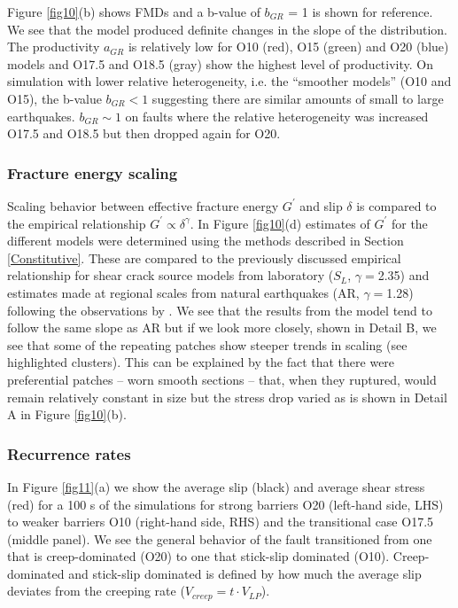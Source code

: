 \documentclass[preprint,1p, 10pt,authoryear]{elsarticle}
\begin{document}
Figure \ref{fig10}(b) shows FMDs and a b-value of $b_{GR}$ = 1 is shown for reference. We see that the model produced definite changes in the slope of the distribution.  The productivity $a_{GR}$  is relatively low for O10 (red), O15 (green) and O20 (blue) models and O17.5 and O18.5 (gray) show the highest level of productivity. On simulation with lower relative heterogeneity, i.e. the ``smoother models'' (O10 and O15), the b-value $b_{GR} < 1$ suggesting there are similar amounts of small to large earthquakes.  $b_{GR} \sim 1$ on faults where the relative heterogeneity was increased O17.5 and O18.5 but then dropped again for O20.

\subsubsection{Fracture energy scaling}
\label{FracEnergy}
Scaling behavior between effective fracture energy $G^{'}$ and slip $\delta$  is compared to the  empirical relationship $G^{'} \propto \delta^{\gamma}$. In Figure \ref{fig10}(d) estimates of $G^{'}$ for the different models were determined using the methods described in Section \ref{Constitutive}. These are compared to the previously discussed empirical relationship for shear crack source models from laboratory ($S_{L}$, $\gamma = $2.35) \citep{Selvadurai2019}  and estimates made at regional scales from natural earthquakes (AR, $\gamma = $1.28) following the observations by \citet{Abercrombie2005}.  We see that the results from the model tend to follow the same slope as AR but if we look more closely, shown in Detail B, we see that some of the repeating patches show steeper trends in scaling (see highlighted clusters). This can be explained by the fact that there were preferential patches -- worn smooth sections -- that, when they ruptured, would remain relatively constant in size but the stress drop varied as is shown in Detail A in Figure \ref{fig10}(b).

\subsubsection{Recurrence rates}
\label{Recurrence times}
In Figure \ref{fig11}(a) we show the average slip (black) and average shear stress (red) for a 100 s of the simulations for strong barriers O20 (left-hand side, LHS) to weaker barriers O10 (right-hand side, RHS) and the transitional case O17.5 (middle panel).  We see the general behavior of the fault transitioned from one that is creep-dominated (O20) to one that stick-slip dominated (O10). Creep-dominated and stick-slip dominated is defined by how much the average slip deviates from the creeping rate ($V_{creep} = t\cdot V_{LP}$). 
\end{document}
